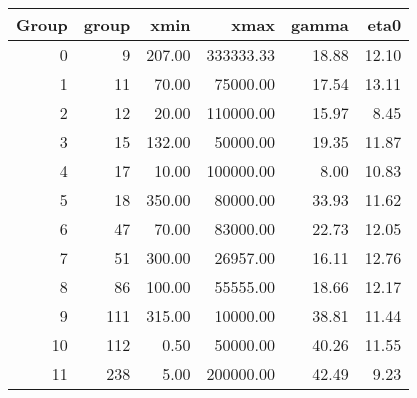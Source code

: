 \begin{tabular}{rrrrrr}
\toprule
 Group &  group &   xmin &      xmax &  gamma &  eta0 \\
\midrule
     0 &      9 & 207.00 & 333333.33 &  18.88 & 12.10 \\
     1 &     11 &  70.00 &  75000.00 &  17.54 & 13.11 \\
     2 &     12 &  20.00 & 110000.00 &  15.97 &  8.45 \\
     3 &     15 & 132.00 &  50000.00 &  19.35 & 11.87 \\
     4 &     17 &  10.00 & 100000.00 &   8.00 & 10.83 \\
     5 &     18 & 350.00 &  80000.00 &  33.93 & 11.62 \\
     6 &     47 &  70.00 &  83000.00 &  22.73 & 12.05 \\
     7 &     51 & 300.00 &  26957.00 &  16.11 & 12.76 \\
     8 &     86 & 100.00 &  55555.00 &  18.66 & 12.17 \\
     9 &    111 & 315.00 &  10000.00 &  38.81 & 11.44 \\
    10 &    112 &   0.50 &  50000.00 &  40.26 & 11.55 \\
    11 &    238 &   5.00 & 200000.00 &  42.49 &  9.23 \\
\bottomrule
\end{tabular}
